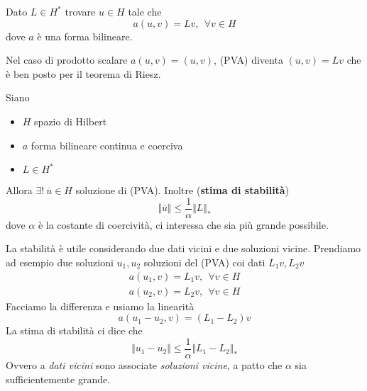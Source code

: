 \documentclass[10pt,a4paper,twoside,openright]{book}
\begin{document}
\begin{definition}
 Dato $L\in H^{*}$ trovare $u\in H$ tale che
\begin{equation*}
a(u,v) =Lv,\ \ \forall v\in H
\end{equation*}
dove $a$ è una forma bilineare.
\end{definition}
Nel caso di prodotto scalare $a(u,v) =(u,v)$, (PVA) diventa $(u,v) =Lv$ che è ben posto per il teorema di Riesz.
\begin{theorem}
 Siano
\begin{itemize}
\item $H$ spazio di Hilbert
\item $a$ forma bilineare continua e coerciva
\item $L\in H^{*}$
\end{itemize}

Allora $\exists !\ \overline{u} \in H$ soluzione di (PVA). Inoltre (\textbf{stima di stabilità})
\begin{equation*}
\Vert \overline{u}\Vert \leqslant \frac{1}{\alpha }\Vert L\Vert _{*}
\end{equation*}
dove $\alpha $ è la costante di coercività, ci interessa che sia più grande possibile.
\end{theorem}
\begin{oss}
La stabilità è utile considerando due dati vicini e due soluzioni vicine. Prendiamo ad esempio due soluzioni $u_{1},u_{2}$ soluzioni del (PVA) coi dati $L_{1} v,L_{2} v$
\begin{gather*}
a(u_{1},v) =L_{1} v,\ \ \forall v\in H\\
a(u_{2},v) =L_{2} v,\ \ \forall v\in H
\end{gather*}
Facciamo la differenza e usiamo la linearità
\begin{equation*}
a(u_{1} -u_{2},v) =(L_{1} -L_{2}) v
\end{equation*}
La stima di stabilità ci dice che
\begin{equation*}
\Vert u_{1} -u_{2}\Vert \leqslant \frac{1}{\alpha }\Vert L_{1} -L_{2}\Vert _{*}
\end{equation*}
Ovvero a \textit{dati vicini} sono associate \textit{soluzioni vicine}, a patto che $\alpha $ sia sufficientemente grande.
\end{oss}
\end{document}
